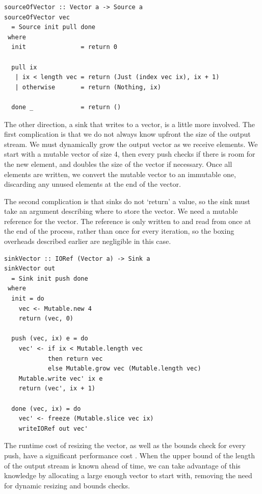 \begin{lstlisting}
sourceOfVector :: Vector a -> Source a
sourceOfVector vec
  = Source init pull done
 where
  init               = return 0

  pull ix
   | ix < length vec = return (Just (index vec ix), ix + 1)
   | otherwise       = return (Nothing, ix)

  done _             = return ()
\end{lstlisting}

The other direction, a sink that writes to a vector, is a little more involved.
The first complication is that we do not always know upfront the size of the output stream.
We must dynamically grow the output vector as we receive elements.
We start with a mutable vector of size 4, then every push checks if there is room for the new element, and doubles the size of the vector if necessary.
Once all elements are written, we convert the mutable vector to an immutable one, discarding any unused elements at the end of the vector.

The second complication is that sinks do not `return' a value, so the sink must take an argument describing where to store the vector.
We need a mutable reference for the vector.
The reference is only written to and read from once at the end of the process, rather than once for every iteration, so the boxing overheads described earlier are negligible in this case.

\begin{lstlisting}
sinkVector :: IORef (Vector a) -> Sink a
sinkVector out
  = Sink init push done
 where
  init = do
    vec <- Mutable.new 4
    return (vec, 0)

  push (vec, ix) e = do
    vec' <- if ix < Mutable.length vec
            then return vec
            else Mutable.grow vec (Mutable.length vec)
    Mutable.write vec' ix e
    return (vec', ix + 1)

  done (vec, ix) = do
    vec' <- freeze (Mutable.slice vec ix)
    writeIORef out vec'
\end{lstlisting}

The runtime cost of resizing the vector, as well as the bounds check for every push, have a significant performance cost .
When the upper bound of the length of the output stream is known ahead of time, we can take advantage of this knowledge by allocating a large enough vector to start with, removing the need for dynamic resizing and bounds checks.


